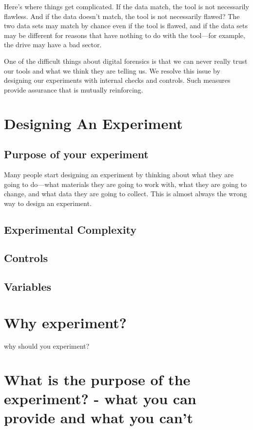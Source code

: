 Here's where things get complicated. If the data match, the tool is
not necessarily flawless. And if the data doesn't match, the tool
is not necessarily flawed? The two data sets may match by chance even
if the tool is flawed, and if the data sets may be different for
reasons that have nothing to do with the tool---for example, the drive
may have a bad sector. 

One of the difficult things about digital forensics is that we
can never really trust our tools and what we think they are telling
us. We resolve this issue by designing our experiments with internal
checks and controls. Such measures provide assurance that is mutually reinforcing.

\section{Designing An Experiment}


\subsection{Purpose of your experiment}

Many people start designing an experiment by thinking about what they
are going to do---what materials they are going to work with, what they are going to
change, and what data they are going to collect. This is almost always
the wrong way to design an experiment.

\subsection{Experimental Complexity}

\subsection{Controls}

\subsection{Variables}

\section{Why experiment?}

why should you experiment?

\section{What is the purpose of the experiment? - what you can provide and what you can't}
